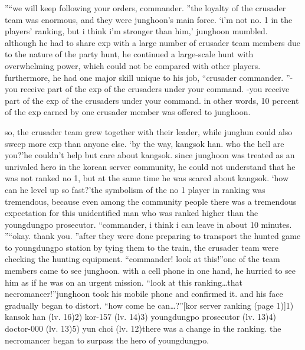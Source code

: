 ”“we will keep following your orders, commander.
”the loyalty of the crusader team was enormous, and they were junghoon’s main force.
‘i’m not no.
1 in the players’ ranking, but i think i’m stronger than him,’ junghoon mumbled.
although he had to share exp with a large number of crusader team members due to the nature of the party hunt, he continued a large-scale hunt with overwhelming power, which could not be compared with other players.
furthermore, he had one major skill unique to his job, “crusader commander.
”-you receive part of the exp of the crusaders under your command.
-you receive part of the exp of the crusaders under your command.
in other words, 10 percent of the exp earned by one crusader member was offered to junghoon.


so, the crusader team grew together with their leader, while junghun could also sweep more exp than anyone else.
‘by the way, kangsok han.
 who the hell are you?’he couldn’t help but care about kangsok.
 since junghoon was treated as an unrivaled hero in the korean server community, he could not understand that he was not ranked no 1, but at the same time he was scared about kangsok.
‘how can he level up so fast?’the symbolism of the no 1 player in ranking was tremendous, because even among the community people there was a tremendous expectation for this unidentified man who was ranked higher than the youngdungpo prosecutor.
“commander, i think i can leave in about 10 minutes.
”“okay.
 thank you.
”after they were done preparing to transport the hunted game to youngdungpo station by tying them to the train, the crusader team were checking the hunting equipment.
“commander! look at this!”one of the team members came to see junghoon.
 with a cell phone in one hand, he hurried to see him as if he was on an urgent mission.
“look at this ranking…that necromancer!”junghoon took his mobile phone and confirmed it.
 and his face gradually began to distort.
“how come he can…?”[kor server ranking (page 1)]1) kansok han (lv.
 16)2) kor-157 (lv.
 14)3) youngdungpo prosecutor (lv.
 13)4) doctor-000 (lv.
 13)5) yun choi (lv.
 12)there was a change in the ranking.
the necromancer began to surpass the hero of youngdungpo.


 